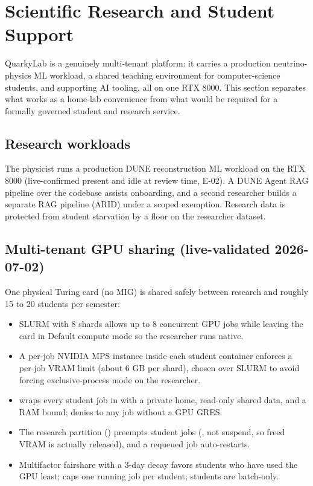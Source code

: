 \section{Scientific Research and Student Support}\label{sec:scientific-student}

QuarkyLab is a genuinely multi-tenant platform: it carries a production neutrino-physics ML
workload, a shared teaching environment for computer-science students, and supporting AI tooling,
all on one RTX 8000. This section separates what works as a home-lab convenience from what would
be required for a formally governed student and research service.

\subsection{Research workloads}

The physicist  runs a production DUNE reconstruction ML workload on the RTX 8000
(live-confirmed present and idle at review time, E-02). A DUNE Agent RAG pipeline over the
 codebase assists onboarding, and a second researcher builds a separate RAG
pipeline (ARID) under a scoped exemption. Research data is protected from student starvation by a
 floor on the researcher dataset.

\subsection{Multi-tenant GPU sharing (live-validated 2026-07-02)}

One physical Turing card (no MIG) is shared safely between research and roughly 15 to 20 students
per semester:

\begin{itemize}
\item {} SLURM  with 8 shards allows up to 8 concurrent GPU jobs
while leaving the card in Default compute mode so the researcher runs native.
\item {} A per-job NVIDIA MPS instance inside each student container enforces a
per-job VRAM limit (about 6 GB per shard), chosen over SLURM  to avoid forcing
exclusive-process mode on the researcher.
\item {}  wraps every student job in  with a private home, read-only shared data, and a RAM bound;  denies  to any job without a GPU GRES.
\item {} The research partition () preempts student jobs
(, not suspend, so freed VRAM is actually released), and a
requeued job auto-restarts.
\item {} Multifactor fairshare with a 3-day decay favors students who have used the
GPU least;  caps one running job per student; students are batch-only.
\end{itemize}

